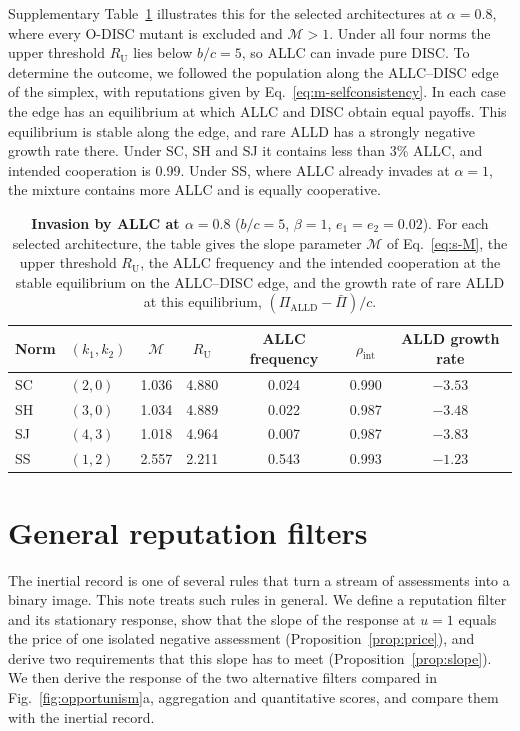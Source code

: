 \documentclass[10pt]{wlscirep}
\newcommand{\ALLD}{\mathrm{ALLD}}
\theoremstyle{plain}
\theoremstyle{remark}
\begin{document}
Supplementary Table~\ref{tab:si-generous} illustrates this for the selected architectures at $\alpha=0.8$, where every O-DISC mutant is excluded and $\mathcal M>1$. Under all four norms the upper threshold $R_{\mathrm U}$ lies below $b/c=5$, so ALLC can invade pure DISC. To determine the outcome, we followed the population along the ALLC--DISC edge of the simplex, with reputations given by Eq.~\eqref{eq:m-selfconsistency}. In each case the edge has an equilibrium at which ALLC and DISC obtain equal payoffs. This equilibrium is stable along the edge, and rare ALLD has a strongly negative growth rate there. Under SC, SH and SJ it contains less than 3\% ALLC, and intended cooperation is 0.99. Under SS, where ALLC already invades at $\alpha=1$, the mixture contains more ALLC and is equally cooperative.

\begin{table}[!htbp]
\centering
\caption{\textbf{Invasion by ALLC at $\alpha=0.8$} ($b/c=5$, $\beta=1$, $e_1=e_2=0.02$). For each selected architecture, the table gives the slope parameter $\mathcal M$ of Eq.~\eqref{eq:s-M}, the upper threshold $R_{\mathrm U}$, the ALLC frequency and the intended cooperation at the stable equilibrium on the ALLC--DISC edge, and the growth rate of rare ALLD at this equilibrium, $(\Pi_{\ALLD}-\bar\Pi)/c$.}
\label{tab:si-generous}
\small
\begin{tabular}{@{}llccccc@{}}
\toprule
Norm & $(k_1,k_2)$ & $\mathcal M$ & $R_{\mathrm U}$ & ALLC frequency & $\rho_{\mathrm{int}}$ & ALLD growth rate\\
\midrule
SC & $(2,0)$ & 1.036 & 4.880 & 0.024 & 0.990 & $-3.53$\\
SH & $(3,0)$ & 1.034 & 4.889 & 0.022 & 0.987 & $-3.48$\\
SJ & $(4,3)$ & 1.018 & 4.964 & 0.007 & 0.987 & $-3.83$\\
SS & $(1,2)$ & 2.557 & 2.211 & 0.543 & 0.993 & $-1.23$\\
\bottomrule
\end{tabular}
\end{table}

\FloatBarrier
\section{General reputation filters}
\label{si:filters}

The inertial record is one of several rules that turn a stream of assessments into a binary image. This note treats such rules in general. We define a reputation filter and its stationary response, show that the slope of the response at $u=1$ equals the price of one isolated negative assessment (Proposition~\ref{prop:price}), and derive two requirements that this slope has to meet (Proposition~\ref{prop:slope}). We then derive the response of the two alternative filters compared in Fig.~\ref{fig:opportunism}a, aggregation and quantitative scores, and compare them with the inertial record.
\end{document}

